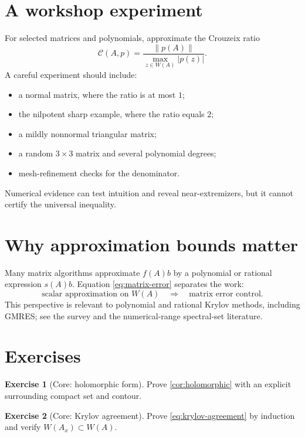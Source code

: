 \documentclass[11pt,oneside,openany]{book}
\theoremstyle{definition}
\newtheorem{exercise}{Exercise}[chapter]
\theoremstyle{remark}
\newcommand{\norm}[1]{\left\lVert #1\right\rVert}
\begin{document}
\section{A workshop experiment}

For selected matrices and polynomials, approximate the Crouzeix ratio
\[
  \mathcal C(A,p)=
  \frac{\norm{p(A)}}
       {\max_{z\in W(A)}|p(z)|}.
\]
A careful experiment should include:
\begin{itemize}
  \item a normal matrix, where the ratio is at most \(1\);
  \item the nilpotent sharp example, where the ratio equals \(2\);
  \item a mildly nonnormal triangular matrix;
  \item a random \(3\times3\) matrix and several polynomial degrees;
  \item mesh-refinement checks for the denominator.
\end{itemize}
Numerical evidence can test intuition and reveal near-extremizers, but
it cannot certify the universal inequality.

\section{Why approximation bounds matter}

Many matrix algorithms approximate \(f(A)b\) by a polynomial or
rational expression \(s(A)b\).  Equation \eqref{eq:matrix-error}
separates the work:
\[
  \text{scalar approximation on }W(A)
  \quad\Longrightarrow\quad
  \text{matrix error control}.
\]
This perspective is relevant to polynomial and rational Krylov
methods, including GMRES; see the survey
\cite{BickelEtAl2020} and the numerical-range spectral-set literature.

\section{Exercises}

\begin{exercise}[Core: holomorphic form]
Prove \cref{cor:holomorphic} with an explicit surrounding compact set
and contour.
\end{exercise}

\begin{exercise}[Core: Krylov agreement]
\label{ex:krylov}
Prove \eqref{eq:krylov-agreement} by induction and verify
\(W(A_x)\subset W(A)\).
\end{exercise}
\end{document}
